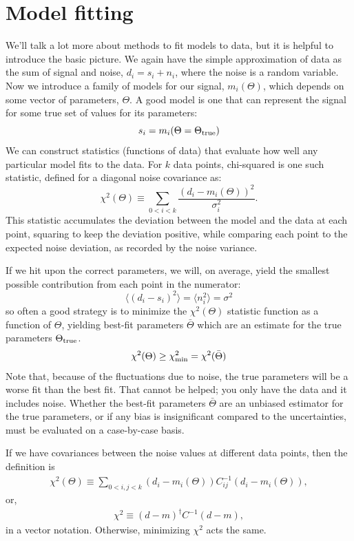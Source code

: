 \section{Model fitting}
We'll talk a lot more about methods to fit models to data, but it is helpful to introduce the basic picture.  We again have the simple approximation of data as the sum of signal and noise, $d_i = s_i+n_i$, where the noise is a random variable.  Now we introduce a family of models for our signal, $m_i(\Theta)$, which depends on some vector of parameters, $\Theta$.  A good model is one that can represent the signal for some true set of values for its parameters:
\begin{equation}
  s_i=m_i(\Theta = \Theta_{\rm true})
\end{equation}
We can construct statistics (functions of data) that evaluate how well any particular model fits to the data.  For $k$ data points, chi-squared is one such statistic, defined for a diagonal noise covariance as:
\begin{equation}
  \chi^2(\Theta) \equiv \sum_{0<i<k} \frac{(d_i - m_i(\Theta))^2}{\sigma_i^2}.
\end{equation}
This statistic accumulates the deviation between the model and the data at each point, squaring to keep the deviation positive, while comparing each point to the expected noise deviation, as recorded by the noise variance.

If we hit upon the correct parameters, we will, on average, yield the smallest possible contribution from each point in the numerator:
\begin{equation}
  \langle (d_i - s_i)^2 \rangle = \langle n_i^2 \rangle = \sigma^2
\end{equation}
so often a good strategy is to minimize the $\chi^2(\Theta)$ statistic function as a function of $\Theta$, yielding best-fit parameters $\bar \Theta$ which are an estimate for the true parameters $\Theta_{\rm true}$.
\begin{equation}
   \chi^2(\Theta) \geq \chi^2_{\rm min} =  \chi^2(\bar \Theta)
\end{equation}
Note that, because of the fluctuations due to noise, the true parameters will be a worse fit than the best fit.  That cannot be helped; you only have the data and it includes noise.  Whether the  best-fit parameters $\bar \Theta$ are an unbiased estimator for the true parameters, or if any bias is insignificant compared to the uncertainties, must be evaluated on a case-by-case basis.

If we have covariances between the noise values at different data points, then the definition is 
\begin{eqnarray}
  \chi^2(\Theta) \equiv \sum_{0<i,j<k} (d_i - m_i(\Theta))C^{-1}_{ij} (d_i - m_i(\Theta)),
\end{eqnarray}
or,
\begin{eqnarray}
\chi^2  \equiv (d-m)^\dag C^{-1} (d-m),
\end{eqnarray}
in a vector notation.  Otherwise, minimizing $\chi^2$ acts the same.

